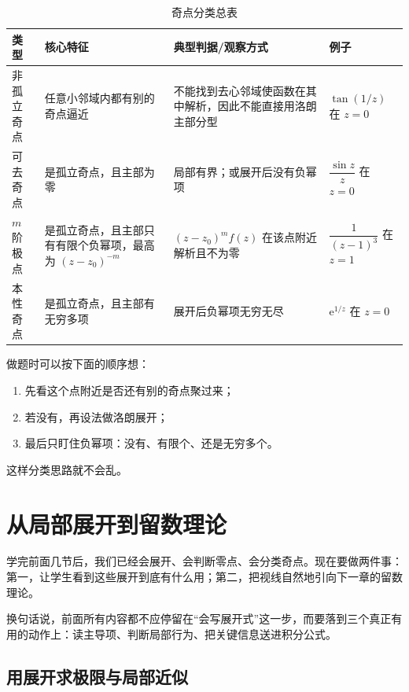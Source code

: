 \begin{table}[htbp]
\centering
\small
\caption{奇点分类总表}
\label{tab:singularity-summary}
\begin{tabular}{@{}p{2.2cm}p{3.4cm}p{3.8cm}p{2.8cm}@{}}
\toprule
类型 & 核心特征 & 典型判据/观察方式 & 例子 \\
\midrule
非孤立奇点 & 任意小邻域内都有别的奇点逼近 & 不能找到去心邻域使函数在其中解析，因此不能直接用洛朗主部分型 & $\tan(1/z)$ 在 $z=0$ \\
可去奇点 & 是孤立奇点，且主部为零 & 局部有界；或展开后没有负幂项 & $\dfrac{\sin z}{z}$ 在 $z=0$ \\
$m$ 阶极点 & 是孤立奇点，且主部只有有限个负幂项，最高为 $(z-z_0)^{-m}$ & $(z-z_0)^m f(z)$ 在该点附近解析且不为零 & $\dfrac{1}{(z-1)^3}$ 在 $z=1$ \\
本性奇点 & 是孤立奇点，且主部有无穷多项 & 展开后负幂项无穷无尽 & $\mathrm{e}^{1/z}$ 在 $z=0$ \\
\bottomrule
\end{tabular}
\end{table}

\begin{tishi}[如何使用这张总表]
做题时可以按下面的顺序想：
\begin{enumerate}
    \item 先看这个点附近是否还有别的奇点聚过来；
    \item 若没有，再设法做洛朗展开；
    \item 最后只盯住负幂项：没有、有限个、还是无穷多个。
\end{enumerate}
这样分类思路就不会乱。
\end{tishi}

\section{从局部展开到留数理论}

\begin{wulibj}[本节的任务]
学完前面几节后，我们已经会展开、会判断零点、会分类奇点。现在要做两件事：第一，让学生看到这些展开到底有什么用；第二，把视线自然地引向下一章的留数理论。
\end{wulibj}

换句话说，前面所有内容都不应停留在``会写展开式''这一步，而要落到三个真正有用的动作上：读主导项、判断局部行为、把关键信息送进积分公式。

\subsection{用展开求极限与局部近似}

